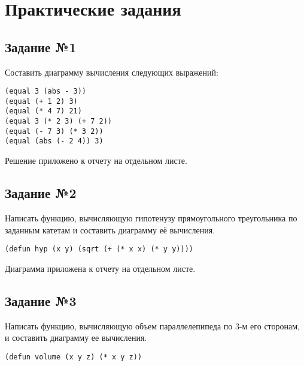 \chapter{Практические задания}

\section{Задание №1}

Составить диаграмму вычисления следующих выражений:

\vspace{4mm}
\hfill
\begin{minipage}{0.81\linewidth}
\begin{lstlisting}
(equal 3 (abs - 3))
(equal (+ 1 2) 3)
(equal (* 4 7) 21)
(equal 3 (* 2 3) (+ 7 2))
(equal (- 7 3) (* 3 2))
(equal (abs (- 2 4)) 3)
\end{lstlisting}
\end{minipage}

Решение приложено к отчету на отдельном листе.

\section{Задание №2}

Написать функцию, вычисляющую гипотенузу прямоугольного треугольника по
заданным катетам и составить диаграмму её вычисления.

\vspace{4mm}
\begin{minipage}{0.92\linewidth}
\begin{lstlisting}
(defun hyp (x y) (sqrt (+ (* x x) (* y y))))
\end{lstlisting}
\end{minipage}

Диаграмма приложена к отчету на отдельном листе.

\section{Задание №3}

Написать функцию, вычисляющую объем параллелепипеда по 3-м его
сторонам, и составить диаграмму ее вычисления.

\vspace{4mm}
\begin{minipage}{0.92\linewidth}
\begin{lstlisting}
(defun volume (x y z) (* x y z))
\end{lstlisting}
\end{minipage}

